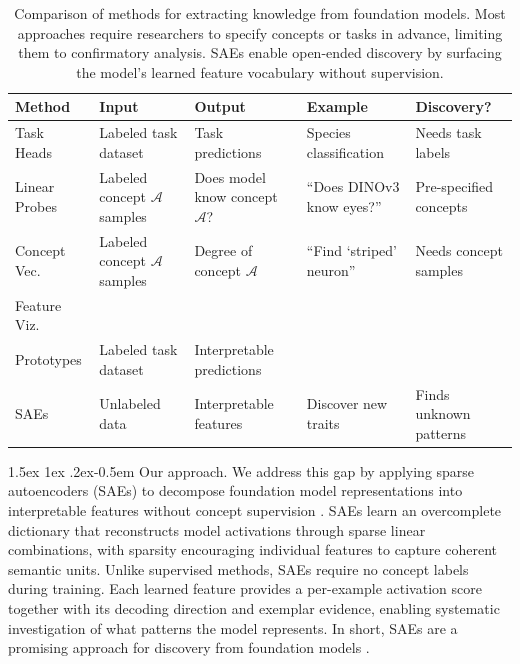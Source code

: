 \documentclass[10pt,twocolumn,letterpaper]{article}
\makeatletter
\renewcommand{\paragraph}{%
  \@startsection{paragraph}{4}%
  {\z@}{1.5ex \@plus 1ex \@minus .2ex}{-0.5em}%
  {\normalfont\normalsize\bfseries}%
}
\newcommand{\cmark}{\textcolor{green}{\ding{51}}}
\newcommand{\xmark}{\textcolor{red}{\ding{55}}}
\makeatother
\begin{document}
\begin{table}[t]
    \centering
    \small
    \renewcommand{\arraystretch}{1.2}
    \setlength{\tabcolsep}{4pt}
    \caption{Comparison of methods for extracting knowledge from foundation models. Most approaches require researchers to specify concepts or tasks in advance, limiting them to confirmatory analysis. SAEs enable open-ended discovery by surfacing the model's learned feature vocabulary without supervision.}
    \label{tab:related-work}
    \begin{tabular}{lllll}
    \toprule
    \textbf{Method} & \textbf{Input} & \textbf{Output} & \textbf{Example} & \textbf{Discovery?} \\
    \midrule
    Task Heads & Labeled task dataset & Task predictions & Species classification & \xmark{} Needs task labels \\
    Linear Probes & Labeled concept $\mathcal{A}$ samples & Does model know concept $\mathcal{A}$? & ``Does DINOv3 know eyes?'' & \xmark{} Pre-specified concepts \\
    Concept Vec. & Labeled concept $\mathcal{A}$ samples & Degree of concept $\mathcal{A}$ & ``Find `striped' neuron'' & \xmark{} Needs concept samples \\
    Feature Viz. & \\
    Prototypes & Labeled task dataset & Interpretable predictions\\
    SAEs & Unlabeled data & Interpretable features & Discover new traits & \cmark{} Finds unknown patterns \\
    \bottomrule
    \end{tabular}
\end{table}

\paragraph{Our approach.}
We address this gap by applying sparse autoencoders (SAEs) to decompose foundation model representations into interpretable features without concept supervision \citep{cunningham2024sparse,gao2025scaling}.
SAEs learn an overcomplete dictionary that reconstructs model activations through sparse linear combinations, with sparsity encouraging individual features to capture coherent semantic units.
Unlike supervised methods, SAEs require no concept labels during training.
Each learned feature provides a per-example activation score together with its decoding direction and exemplar evidence, enabling systematic investigation of what patterns the model represents.
In short, SAEs are a promising approach for discovery from foundation models \citep{peng2025unknown}.
\end{document}
